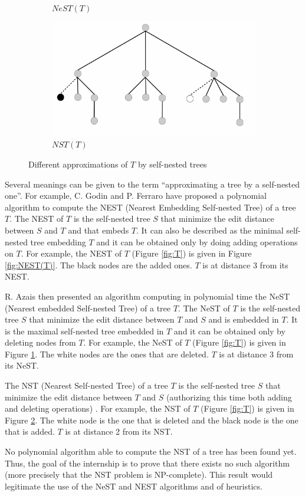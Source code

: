 \begin{figure}
\begin{subfigure}[b]{0.475\textwidth}
    \caption{$NeST(T)$}    
    \label{fig:NeST(T)}
  \end{subfigure}
  \quad
  \begin{subfigure}[b]{0.475\textwidth}   
    \centering 
    \includegraphics[width=\textwidth]{figures/NST(T).pdf}
    \caption{$NST(T)$}    
    \label{fig:NST(T)}
  \end{subfigure}
  \caption{Different approximations of $T$ by self-nested trees} 
  \label{fig:approx}
\end{figure}
    
Several meanings can be given to the term ``approximating a tree by a
self-nested one''. For example, C. Godin and P. Ferraro have proposed a
polynomial algorithm \cite{godin} to compute the NEST (Nearest
Embedding Self-nested Tree) of a tree $T$. The NEST of $T$ is the
self-nested tree $S$ that minimize the edit distance between $S$ and
$T$ and that embeds $T$. It can also be described as the minimal
self-nested tree embedding $T$ and it can be obtained only by doing
adding operations on $T$.
For example, the NEST of $T$ (Figure \ref{fig:T}) is given in Figure
\ref{fig:NEST(T)}. The black nodes are the added ones. $T$ is at
distance 3 from its NEST. 

R. Azais then presented an algorithm \cite{romain} computing in
polynomial time the NeST (Nearest embedded
Self-nested Tree) of a tree $T$. The NeST of $T$ is the self-nested tree $S$ that
minimize the edit distance between $T$ and $S$ and is embedded in
$T$. It is the maximal self-nested tree embedded in $T$ and it can be
obtained only by deleting nodes from $T$. %
For example, the NeST of $T$ (Figure \ref{fig:T}) is given in Figure
\ref{fig:NeST(T)}. The white nodes are the ones that are deleted. $T$
is at distance 3 from its NeST. 

The NST (Nearest Self-nested Tree) of a tree $T$ is the self-nested
tree $S$ that minimize the edit distance between $T$ and $S$
(authorizing this time both adding and deleting operations)
\cite{godin}.  For example, the NST of $T$ (Figure \ref{fig:T}) is
given in Figure \ref{fig:NST(T)}. The white node is the one that is
deleted and the black node is the one that is added. $T$ is at
distance 2 from its NST.

No polynomial algorithm able to compute the NST of a tree has been
found yet. Thus, the goal of the internship is to prove that there
exists no such algorithm (more precisely that the NST problem is
NP-complete). This result would legitimate the use of the NeST and
NEST algorithms and of heuristics.
